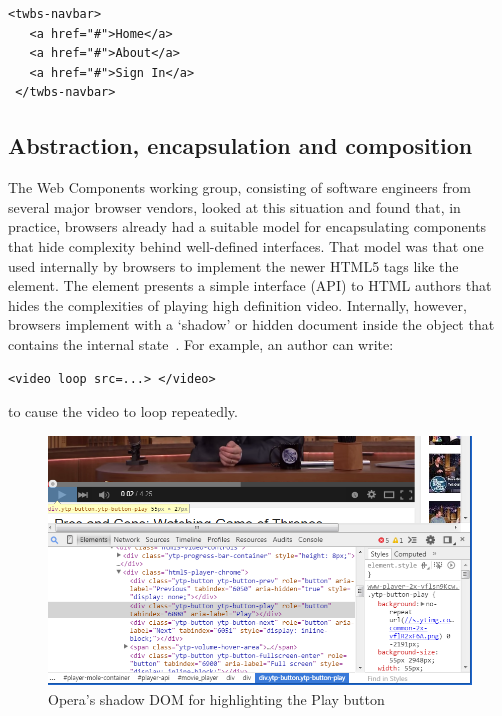 \begin{lstlisting}[language=HTML5,caption={Hypothetical Bootstrap nav bar custom element.},label=l:twbs2]
 <twbs-navbar>
   <a href="#">Home</a>
   <a href="#">About</a>
   <a href="#">Sign In</a>
 </twbs-navbar>
\end{lstlisting}

\subsection{Abstraction, encapsulation and composition}

The Web Components working group, consisting of software engineers from several major browser vendors, 
looked at this situation and found that, in practice, browsers already had a suitable model for encapsulating components that hide complexity behind well-defined interfaces.
That model was that one used internally by browsers to implement the newer 
HTML5 tags 
like the \textbf{} element. 
The  element presents a simple interface (API) to HTML authors that hides the complexities of playing high definition video.
Internally, however, browsers implement  with a `shadow' or hidden document inside the object that contains the internal state~\cite{kitamura2014}. 
For example, an author can write:
\begin{lstlisting}[language=HTML5,numbers=none]
	<video loop src=...> </video>
\end{lstlisting}
to cause the video to loop repeatedly.

\begin{figure}[htb]
\centerline{\includegraphics[width=6in]{images/html5_video_control.png}} 
\caption{Opera's shadow DOM for  highlighting the Play button}
\label{f:html5video}
\end{figure}

